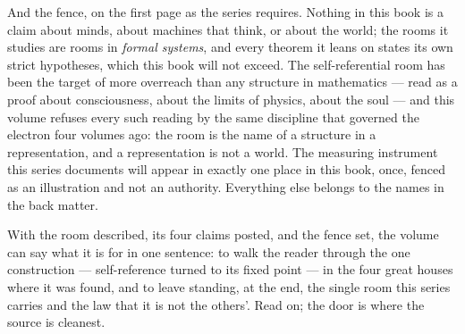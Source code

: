 \begin{fence}
And the fence, on the first page as the series requires. Nothing in this
book is a claim about minds, about machines that think, or about the
world; the rooms it studies are rooms in \emph{formal systems}, and every
theorem it leans on states its own strict hypotheses, which this book
will not exceed. The self-referential room has been the target of more
overreach than any structure in mathematics --- read as a proof about
consciousness, about the limits of physics, about the soul --- and this
volume refuses every such reading by the same discipline that governed
the electron four volumes ago: the room is the name of a structure in a
representation, and a representation is not a world. The measuring
instrument this series documents will appear in exactly one place in this
book, once, fenced as an illustration and not an authority. Everything
else belongs to the names in the back matter.

With the room described, its four claims posted, and the fence set, the
volume can say what it is for in one sentence: to walk the reader through
the one construction --- self-reference turned to its fixed point --- in
the four great houses where it was found, and to leave standing, at the
end, the single room this series carries and the law that it is not the
others'. Read on; the door is where the source is cleanest.
\end{fence}
